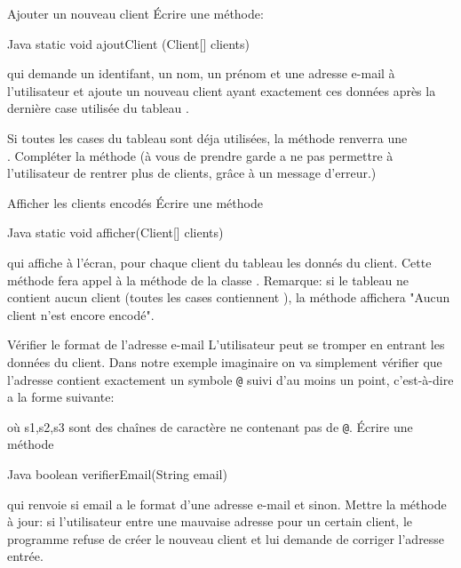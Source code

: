 \documentclass[a4paper,11pt]{article}
\begin{document}
   \begin{Exercice}{Ajouter un nouveau client}
   	 		\'Ecrire une m\'ethode:
		\begin{Code}{Java}
		    static void ajoutClient (Client[] clients)
		\end{Code}
qui demande un identifant, un nom, un pr\'enom et une adresse e-mail \`a l'utilisateur et ajoute un nouveau client ayant exactement ces données apr\`es la derni\`ere case utilis\'ee du tableau .

Si toutes les cases du tableau sont d\'eja utilis\'ees, la m\'ethode renverra une \\. Compl\'eter la m\'ethode  (\`a vous de prendre garde a ne pas permettre \`a l'utilisateur de rentrer plus de  clients, grâce à un message d'erreur.)
				
\end{Exercice}
  
  	\begin{Exercice}{Afficher les clients encod\'es}
	\'Ecrire une m\'ethode
	
		\begin{Code}{Java}
		    static void afficher(Client[] clients)
		\end{Code}
	qui affiche \`a l'\'ecran, pour chaque client du tableau  les donn\'es du client. Cette m\'ethode fera appel \`a la m\'ethode  de la classe . Remarque: si le tableau ne contient aucun client (toutes les cases contiennent ), la m\'ethode affichera "Aucun client n'est encore encod\'e".
		
	\end{Exercice}
	
\begin{Exercice}{V\'erifier le format de l'adresse e-mail}
		L'utilisateur peut se tromper en entrant les donn\'ees du client. Dans notre exemple imaginaire on va simplement v\'erifier que l'adresse contient exactement un symbole \texttt{@} suivi 	d'au moins un point, c'est-à-dire a la forme suivante:
		
	         \begin{center}
                \end{center}
		
		o\`u s1,s2,s3 sont des cha\^ines de caract\`ere ne contenant pas de \texttt{@}. \'Ecrire une m\'ethode 
		
		\begin{Code}{Java}
		boolean verifierEmail(String email)
		\end{Code}
		
		qui renvoie  si email a le format d'une adresse e-mail et  sinon.
		Mettre la m\'ethode  \`a jour: si l'utilisateur entre une mauvaise adresse pour un certain client, le programme refuse de cr\'eer le nouveau client et lui demande de corriger      l'adresse entr\'ee.
	\end{Exercice}
\end{document}
